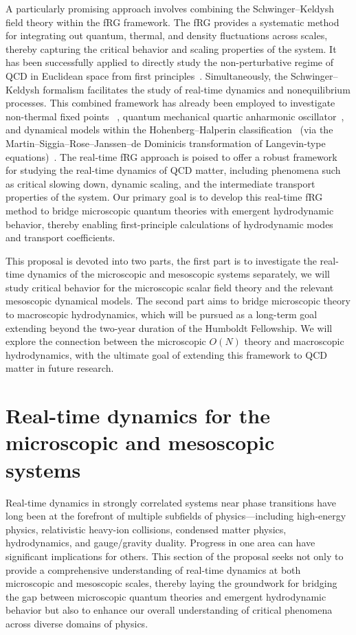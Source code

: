 \documentclass[letterpaper,11pt]{article}
\begin{document}
A particularly promising approach involves combining the Schwinger–Keldysh field theory within the fRG framework. The fRG provides a systematic method for integrating out quantum, thermal, and density fluctuations across scales, thereby capturing the critical behavior and scaling properties of the system. It has been successfully applied to directly study the non-perturbative regime of QCD in Euclidean space from first principles~\cite{Cyrol:2017ewj,Fu:2025hcm}. Simultaneously, the Schwinger–Keldysh formalism facilitates the study of real-time dynamics and nonequilibrium processes. This combined framework has already been employed to investigate non-thermal fixed points ~\cite{Berges:2008sr}, quantum mechanical quartic anharmonic oscillator~\cite{Huelsmann:2020xcy}, and dynamical models within the Hohenberg–Halperin classification~\cite{Hohenberg:1977ym} (via the Martin–Siggia–Rose–Janssen–de Dominicis transformation of Langevin-type equations)~\cite{Roth:2023wbp,Roth:2024hcu,Roth:2024rbi}.  The real-time fRG approach is poised to offer a robust framework for studying the real-time dynamics of QCD matter, including phenomena such as critical slowing down, dynamic scaling, and the intermediate transport properties of the system. Our primary goal is to develop this real-time fRG method to bridge microscopic quantum theories with emergent hydrodynamic behavior, thereby enabling first-principle calculations of hydrodynamic modes and transport coefficients.

This proposal is devoted into two parts, the first part is to investigate the real-time dynamics of the microscopic and mesoscopic systems separately, we will study critical behavior for the microscopic scalar field theory and the relevant mesoscopic dynamical models. The second part aims to bridge microscopic theory to macroscopic hydrodynamics, which will be pursued as a long-term goal extending beyond the two-year duration of the Humboldt Fellowship. We will explore the connection between the microscopic $O(N)$ theory and macroscopic hydrodynamics, with the ultimate goal of extending this framework to QCD matter in future research.


\section{Real-time dynamics for the microscopic and mesoscopic systems}
Real-time dynamics in strongly correlated systems near phase transitions have long been at the forefront of multiple subfields of physics—including high-energy physics, relativistic heavy-ion collisions, condensed matter physics, hydrodynamics, and gauge/gravity duality. Progress in one area can have significant implications for others. This section of the proposal seeks not only to provide a comprehensive understanding of real-time dynamics at both microscopic and mesoscopic scales, thereby laying the groundwork for bridging the gap between microscopic quantum theories and emergent hydrodynamic behavior but also to enhance our overall understanding of critical phenomena across diverse domains of physics.
\end{document}
